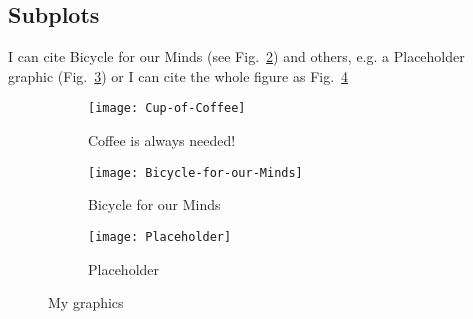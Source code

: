 \begin{landscape}

\section*{Subplots}
I can cite Bicycle for our Minds (see Fig.~\ref{fig:Bicycle-for-our-Minds}) and others, e.g. a Placeholder graphic (Fig.~\ref{fig:aPlaceholder}) or I can cite the whole figure as Fig.~\ref{fig:myGraphics}

\begin{figure}
  \centering
  \begin{subfigure}[b]{0.3\textwidth}
    \texttt{[image: Cup-of-Coffee]}
    \caption{Coffee is always needed!}
    \label{fig:Cup-of-Coffee}   
  \end{subfigure}             
  \begin{subfigure}[b]{0.3\textwidth}
    \texttt{[image: Bicycle-for-our-Minds]}
    \caption{Bicycle for our Minds}
    \label{fig:Bicycle-for-our-Minds}
  \end{subfigure}             
  \begin{subfigure}[b]{0.3\textwidth}
    \texttt{[image: Placeholder]}
    \caption{Placeholder}
    \label{fig:aPlaceholder}
  \end{subfigure}
  \caption{My graphics}
  \label{fig:myGraphics}
\end{figure}

\end{landscape}
